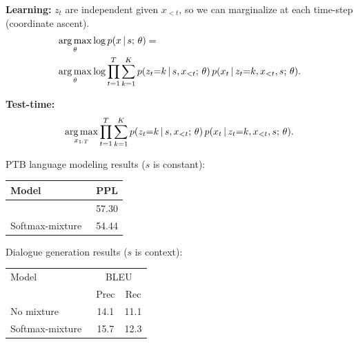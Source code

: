 \begin{frame}
\textbf{Learning:} $z_t$ are independent given $x_{<t}$, so we can marginalize at each time-step (coordinate ascent).
    \begin{align*}
        &\argmax_{\theta} \log p(x \given s \param \theta) =  \\
        &\argmax_{\theta} \log \prod_{t=1}^T \sum_{k=1}^K p(z_t {=} k \given s, x_{<t} \param \theta) \, p(x_t \given z_t{=}k, x_{<t}, s \param \theta).
    \end{align*}

\textbf{Test-time:}
\begin{align*}
\argmax_{x_{1:T}} \prod_{t=1}^T \sum_{k=1}^K p(z_t {=} k \given s, x_{<t} \param \theta) \, p(x_t \given z_t{=}k, x_{<t}, s \param \theta).
\end{align*}
\end{frame}

\begin{frame}
PTB language modeling results ($s$ is constant):
\air
\begin{table}
\begin{tabular}{lc}
\toprule
     Model & PPL \\
\midrule     
     \citet{merity2018regularizing} & 57.30 \\
     Softmax-mixture~\citep{yang2018breaking} & 54.44 \\
\bottomrule
\end{tabular}  
\end{table}

\air
\air
        
Dialogue generation results ($s$ is context):
\air
\begin{table}
\begin{tabular}{lcc}
\toprule
     Model &  \multicolumn{2}{c}{BLEU} \\
     & Prec & Rec \\
\midrule     
     No mixture & 14.1 & 11.1 \\
     Softmax-mixture~\citep{yang2018breaking} & 15.7 & 12.3 \\
\bottomrule
\end{tabular}
\end{table}
    
\end{frame}

